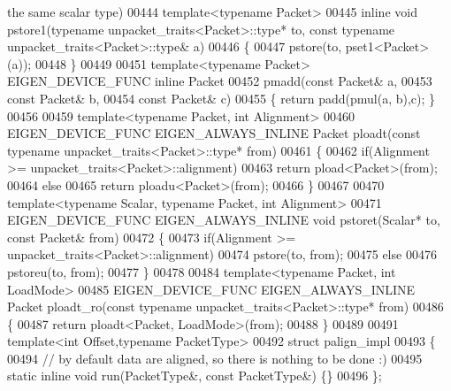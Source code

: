 \begin{DoxyCode}
{{{       the same scalar type)}
00444 \textcolor{keyword}{template}<\textcolor{keyword}{typename} Packet>
00445 \textcolor{keyword}{inline} \textcolor{keywordtype}{void} pstore1(\textcolor{keyword}{typename} unpacket\_traits<Packet>::type* to, \textcolor{keyword}{const} \textcolor{keyword}{typename} 
      unpacket\_traits<Packet>::type& a)
00446 \{
00447   pstore(to, pset1<Packet>(a));
00448 \}
00449 
00451 \textcolor{keyword}{template}<\textcolor{keyword}{typename} Packet> EIGEN\_DEVICE\_FUNC \textcolor{keyword}{inline} Packet
00452 pmadd(\textcolor{keyword}{const} Packet&  a,
00453          \textcolor{keyword}{const} Packet&  b,
00454          \textcolor{keyword}{const} Packet&  c)
00455 \{ \textcolor{keywordflow}{return} padd(pmul(a, b),c); \}
00456 
00459 \textcolor{keyword}{template}<\textcolor{keyword}{typename} Packet, \textcolor{keywordtype}{int} Alignment>
00460 EIGEN\_DEVICE\_FUNC EIGEN\_ALWAYS\_INLINE Packet ploadt(\textcolor{keyword}{const} \textcolor{keyword}{typename} unpacket\_traits<Packet>::type* from)
00461 \{
00462   \textcolor{keywordflow}{if}(Alignment >= unpacket\_traits<Packet>::alignment)
00463     \textcolor{keywordflow}{return} pload<Packet>(from);
00464   \textcolor{keywordflow}{else}
00465     \textcolor{keywordflow}{return} ploadu<Packet>(from);
00466 \}
00467 
00470 \textcolor{keyword}{template}<\textcolor{keyword}{typename} Scalar, \textcolor{keyword}{typename} Packet, \textcolor{keywordtype}{int} Alignment>
00471 EIGEN\_DEVICE\_FUNC EIGEN\_ALWAYS\_INLINE \textcolor{keywordtype}{void} pstoret(Scalar* to, \textcolor{keyword}{const} Packet& from)
00472 \{
00473   \textcolor{keywordflow}{if}(Alignment >= unpacket\_traits<Packet>::alignment)
00474     pstore(to, from);
00475   \textcolor{keywordflow}{else}
00476     pstoreu(to, from);
00477 \}
00478 
00484 \textcolor{keyword}{template}<\textcolor{keyword}{typename} Packet, \textcolor{keywordtype}{int} LoadMode>
00485 EIGEN\_DEVICE\_FUNC EIGEN\_ALWAYS\_INLINE Packet ploadt\_ro(\textcolor{keyword}{const} \textcolor{keyword}{typename} unpacket\_traits<Packet>::type* from)
00486 \{
00487   \textcolor{keywordflow}{return} ploadt<Packet, LoadMode>(from);
00488 \}
00489 
00491 \textcolor{keyword}{template}<\textcolor{keywordtype}{int} Offset,\textcolor{keyword}{typename} PacketType>
00492 \textcolor{keyword}{struct }palign\_impl
00493 \{
00494   \textcolor{comment}{// by default data are aligned, so there is nothing to be done :)}
00495   \textcolor{keyword}{static} \textcolor{keyword}{inline} \textcolor{keywordtype}{void} run(PacketType&, \textcolor{keyword}{const} PacketType&) \{\}
00496 \};
}}
\end{DoxyCode}
